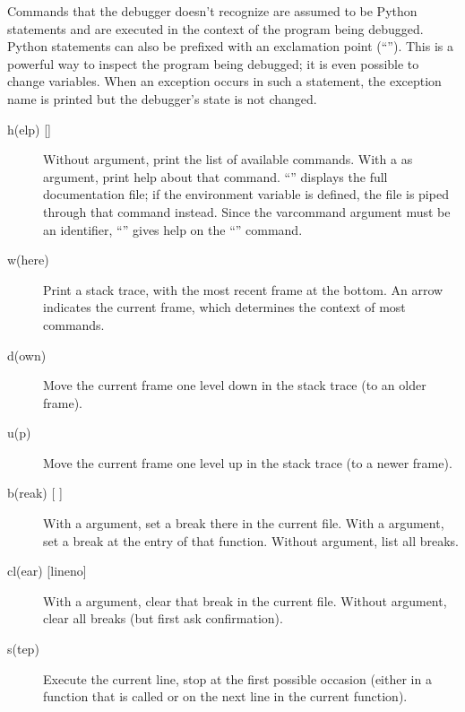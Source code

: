 Commands that the debugger doesn't recognize are assumed to be Python
statements and are executed in the context of the program being
debugged.  Python statements can also be prefixed with an exclamation
point (``\code{!}'').  This is a powerful way to inspect the program
being debugged; it is even possible to change variables.  When an
exception occurs in such a statement, the exception name is printed
but the debugger's state is not changed.

\begin{description}

\item[{h(elp) []}]

Without argument, print the list of available commands.
With a  as argument, print help about that command.
``'' displays the full documentation file; if the
environment variable  is defined, the file is piped
through that command instead.  Since the var{command} argument must be
an identifier, ``'' gives help on the ``\code{!}''
command.

\item[{w(here)}]

Print a stack trace, with the most recent frame at the bottom.
An arrow indicates the current frame, which determines the
context of most commands.

\item[{d(own)}]

Move the current frame one level down in the stack trace
(to an older frame).

\item[{u(p)}]

Move the current frame one level up in the stack trace
(to a newer frame).

\item[{b(reak) [ \code{|} ]}]

With a  argument, set a break there in the current
file.  With a  argument, set a break at the entry of
that function.  Without argument, list all breaks.

\item[{cl(ear) [lineno]}]

With a  argument, clear that break in the current file.
Without argument, clear all breaks (but first ask confirmation).

\item[{s(tep)}]

Execute the current line, stop at the first possible occasion
(either in a function that is called or on the next line in the
current function).


\end{description}

